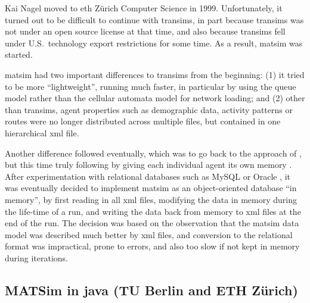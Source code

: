 Kai Nagel moved to \gls{eth} Zürich Computer Science in 1999.  Unfortunately, it turned out to be difficult to continue with \gls{transims}, in part because \gls{transims} was not under an open source license at that time, and also because \gls{transims} fell under U.S.\ technology export restrictions for some time.  As a result, \gls{matsim} was started.

\gls{matsim} had two important differences to \gls{transims} from the beginning: (1) it tried to be more ``lightweight'', \ie running much faster, in particular by using the queue model \citep{GawronPhd,Gawron1998IterativeAlgorithmto} rather than the cellular automata model for network loading; and (2) other than \gls{transims}, agent properties such as demographic data, activity patterns or routes were no longer distributed across multiple files, but contained in one hierarchical \gls{xml} file.

Another difference followed eventually, which was to go back to the approach of \citet{Nagel1996NRW}, but this time truly following \citet{ArthurBar} by giving each individual agent its own memory \citep{RaneyNagel2006traf-framework}.  After experimentation with relational databases such as MySQL \citep{mysql-wikipedia} or Oracle \citep{oracle}, it was eventually decided to implement \gls{matsim} as an object-oriented database ``in memory'', \ie by first reading in all \gls{xml} files, modifying the data in memory during the life-time of a run, and writing the data back from memory to \gls{xml} files at the end of the run.  The decision was based on the observation that the \gls{matsim} data model was described much better by \gls{xml} files, and conversion to the relational format was impractical, prone to errors, and also too slow if not kept in memory during iterations. 

\subsection{MATSim in \protect\gls{java} (TU Berlin and ETH Zürich)}
\label{sec:matsim-in-java}


